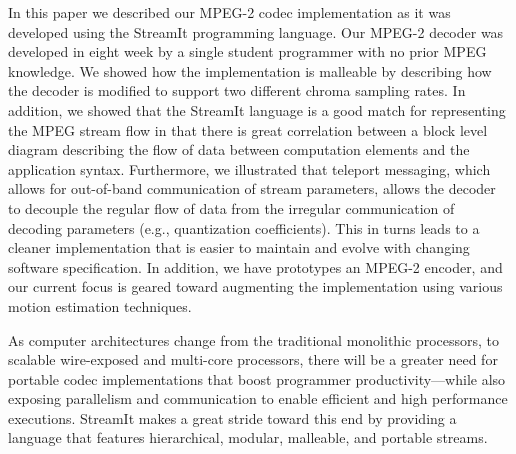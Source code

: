 
In this paper we described our MPEG-2 codec implementation as it was
developed using the StreamIt programming language. Our MPEG-2 decoder
was developed in eight week by a single student programmer with no
prior MPEG knowledge. We showed how the implementation is malleable by
describing how the decoder is modified to support two different chroma
sampling rates. In addition, we showed that the StreamIt language is a
good match for representing the MPEG stream flow in that there is
great correlation between a block level diagram describing the flow of
data between computation elements and the application
syntax. Furthermore, we illustrated that teleport messaging, which
allows for out-of-band communication of stream parameters, allows the
decoder to decouple the regular flow of data from the irregular
communication of decoding parameters (e.g., quantization
coefficients). This in turns leads to a cleaner implementation that is
easier to maintain and evolve with changing software specification.
In addition, we have prototypes an MPEG-2 encoder, and our current
focus is geared toward augmenting the implementation using various
motion estimation techniques.

As computer architectures change from the traditional monolithic
processors, to scalable wire-exposed and multi-core processors, there
will be a greater need for portable codec implementations that boost
programmer productivity---while also exposing parallelism and
communication to enable efficient and high performance executions.
StreamIt makes a great stride toward this end by providing a language
that features hierarchical, modular, malleable, and portable streams.